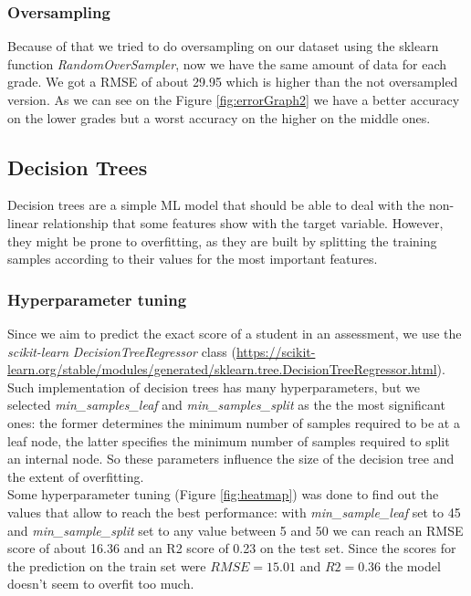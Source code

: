 \documentclass{article}
\begin{document}
\subsubsection{Oversampling}
Because of that we tried to do oversampling on our dataset using the sklearn function \textit{RandomOverSampler}, now we have the same amount of data for each grade. 
We got a RMSE of about 29.95 which is higher than the not oversampled version. As we can see on the Figure \ref{fig:errorGraph2} we have a better accuracy on the lower grades but a worst accuracy on the higher on the middle ones.






\FloatBarrier

\subsection{Decision Trees}

Decision trees are a simple ML model that should be able to deal with the non-linear relationship that some features show with the target variable. However, they might be prone to overfitting, as they are built by splitting the training samples according to their values for the most important features.

\subsubsection{Hyperparameter tuning}
Since we aim to predict the exact score of a student in an assessment, we use the \textit{scikit-learn} \textit{DecisionTreeRegressor} class (\url{https://scikit-learn.org/stable/modules/generated/sklearn.tree.DecisionTreeRegressor.html}). Such implementation of decision trees has many hyperparameters, but we selected \textit{min\_samples\_leaf} and \textit{min\_samples\_split} as the the most significant ones: the former determines the minimum number of samples required to be at a leaf node, the latter specifies the minimum number of samples required to split an internal node. So these parameters influence the size of the decision tree and the extent of overfitting.\\

Some hyperparameter tuning (Figure \ref{fig:heatmap}) was done to find out the values that allow to reach the best performance: with \textit{min\_sample\_leaf} set to 45 and \textit{min\_sample\_split} set to any value between 5 and 50 we can reach an RMSE score of about 16.36 and an R2 score of 0.23 on the test set. Since the scores for the prediction on the train set were $RMSE = 15.01$ and $R2 = 0.36$ the model doesn't seem to overfit too much. \\
\end{document}
